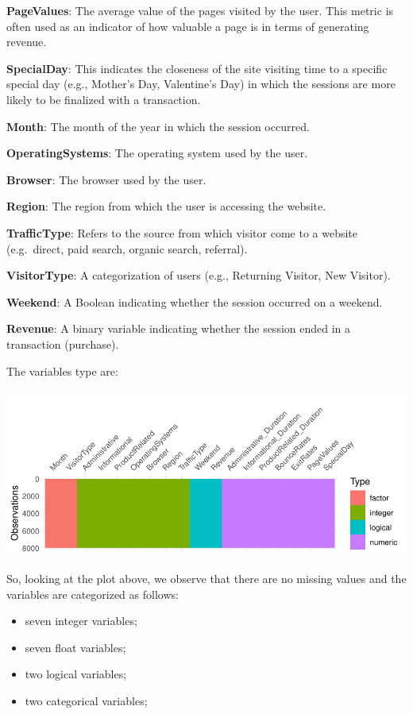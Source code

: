 \documentclass[
]{article}
\begin{document}
\textbf{PageValues}: The average value of the pages visited by the user.
This metric is often used as an indicator of how valuable a page is in
terms of generating revenue.

\textbf{SpecialDay}: This indicates the closeness of the site visiting
time to a specific special day (e.g., Mother's Day, Valentine's Day) in
which the sessions are more likely to be finalized with a transaction.

\textbf{Month}: The month of the year in which the session occurred.

\textbf{OperatingSystems}: The operating system used by the user.

\textbf{Browser}: The browser used by the user.

\textbf{Region}: The region from which the user is accessing the
website.

\textbf{TrafficType}: Refers to the source from which visitor come to a
website (e.g.~direct, paid search, organic search, referral).

\textbf{VisitorType}: A categorization of users (e.g., Returning
Visitor, New Visitor).

\textbf{Weekend}: A Boolean indicating whether the session occurred on a
weekend.

\textbf{Revenue}: A binary variable indicating whether the session ended
in a transaction (purchase).

The variables type are:

\includegraphics{report_official_files/figure-latex/unnamed-chunk-2-1.pdf}

So, looking at the plot above, we observe that there are no missing
values and the variables are categorized as follows:

\begin{itemize}
\item
  seven integer variables;
\item
  seven float variables;
\item
  two logical variables;
\item
  two categorical variables;
\end{itemize}
\end{document}
